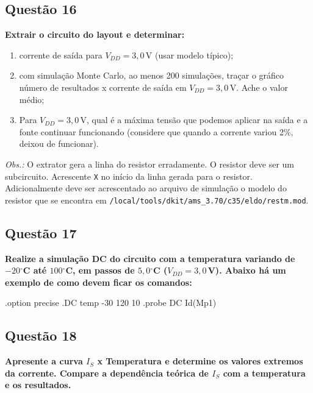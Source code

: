 ﻿\documentclass[12pt,a4paper]{article}
\newcommand{\degree}{\ensuremath{{}^\circ}}
\begin{document}
\subsection*{Questão 16}
\begin{BoxQ}
    \textbf{Extrair o circuito do layout e determinar:}
\begin{enumerate}
    \item corrente de saída para $V_{DD} = 3{,}0$\,V (usar modelo típico);
    \item com simulação Monte Carlo, ao menos 200 simulações, traçar o gráfico número de resultados x corrente de saída em $V_{DD} = 3{,}0$\,V. Ache o valor médio;
    \item Para $V_{DD} = 3{,}0$\,V, qual é a máxima tensão que podemos aplicar na saída e a fonte continuar funcionando (considere que quando a corrente variou 2\%, deixou de funcionar).
\end{enumerate}
    \textit{Obs.:} O extrator gera a linha do resistor erradamente. O resistor deve ser um subcircuito. Acrescente \texttt{X} no início da linha gerada para o resistor. Adicionalmente deve ser acrescentado ao arquivo de simulação o modelo do resistor que se encontra em \texttt{/local/tools/dkit/ams\_3.70/c35/eldo/restm.mod}.
\end{BoxQ}

\subsection*{Questão 17}
\begin{BoxQ}
    \textbf{Realize a simulação DC do circuito com a temperatura variando de $-20$\degree C até $100$\degree C, em passos de $5{,}0$\degree C ($V_{DD} = 3{,}0$\,V). Abaixo há um exemplo de como devem ficar os comandos:}
\begin{codeblock}[title={Exemplo de comandos ELDO}]
.option precise
.DC temp -30 120 10
.probe DC Id(Mp1)
\end{codeblock}
\end{BoxQ}

\subsection*{Questão 18}
\begin{BoxQ}
    \textbf{Apresente a curva $I_{S}$ x Temperatura e determine os valores extremos da corrente. Compare a dependência teórica de $I_{S}$ com a temperatura e os resultados.}
\end{BoxQ}
\end{document}
